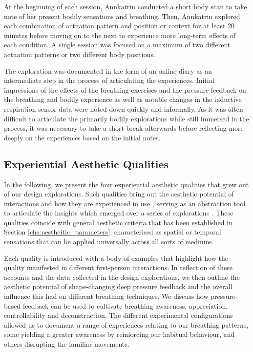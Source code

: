 At the beginning of each session, Annkatrin conducted a short body scan to take note of her present bodily sensations and breathing. Then, Annkatrin explored each combination of actuation pattern and position or context for at least 20 minutes before moving on to the next to experience more long-term effects of each condition. A single session was focused on a maximum of two different actuation patterns or two different body positions.

The exploration was documented in the form of an online diary as an intermediate step in the process of articulating the experiences. Initial impressions of the effects of the breathing exercises and the pressure feedback on the breathing and bodily experience as well as notable changes in the inductive respiration sensor data were noted down quickly and informally. As it was often difficult to articulate the primarily bodily explorations while still immersed in the process, it was necessary to take a short break afterwards before reflecting more deeply on the experiences based on the initial notes.


\subsection{Experiential Aesthetic Qualities}
\label{sec:aesthetic_qualities}

In the following, we present the four experiential aesthetic qualities that grew out of our design explorations. Such qualities bring out the aesthetic potential of interactions and how they are experienced in use \cite{lowgren_toward_2009}, serving as an abstraction tool to articulate the insights which emerged over a series of explorations \cite{stahl_evocative_2014}. These qualities coincide with general aesthetic criteria that has been established in Section \ref{cha:aestheitic_parameters}, characterised as spatial or temporal sensations that can be applied universally across all sorts of mediums.

Each quality is introduced with a body of examples that highlight how the quality manifested in different first-person interactions. In reflection of these accounts and the data collected in the design explorations, we then outline the aesthetic potential of shape-changing deep pressure feedback and the overall influence this had on different breathing techniques. We discuss how pressure-based feedback can be used to cultivate breathing awareness, appreciation, controllability and deconstruction. The different experimental configurations allowed us to document a range of experiences relating to our breathing patterns, some yielding a greater awareness by reinforcing our habitual behaviour, and others disrupting the familiar movements.
%

